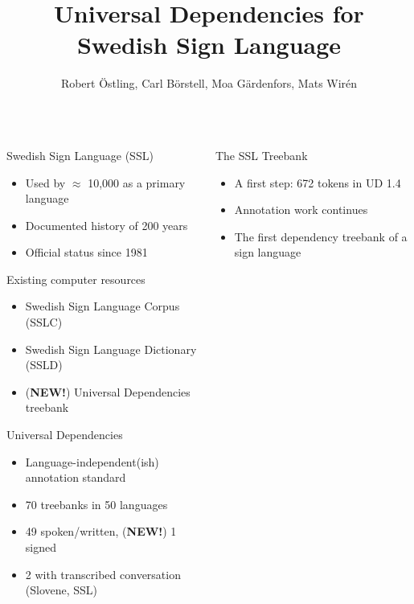 \documentclass[final]{beamer}
\title{Universal Dependencies for Swedish Sign Language}
\author{Robert {\"O}stling, Carl B{\"o}rstell, Moa G{\"a}rdenfors,
    Mats Wir{\'e}n}
\institute{Stockholm University}
\begin{document}
\begin{frame}{}
    \vfill
    \begin{columns}[t]
        \begin{column}{.48\linewidth}

            \begin{block}{\large Swedish Sign Language (SSL)}
                \begin{itemize}
                    \item Used by $\approx$ 10,000 as a primary language
                    \item Documented history of 200 years
                    \item Official status since 1981
                \end{itemize}
            \end{block}

            \begin{block}{\large Existing computer resources}
                \begin{itemize}
                    \item Swedish Sign Language Corpus (SSLC)
                    \item Swedish Sign Language Dictionary (SSLD)
                    \item (\textbf{NEW!}) Universal Dependencies treebank
                \end{itemize}
            \end{block}

            \begin{block}{\large Universal Dependencies}
                \begin{itemize}
                    \item Language-independent(ish) annotation standard
                    \item 70 treebanks in 50 languages
                    \item 49 spoken/written, (\textbf{NEW!}) 1 signed
                    \item 2 with transcribed conversation (Slovene, SSL)
                \end{itemize}
            \end{block}


        \end{column}

        \begin{column}{.48\linewidth}

            \begin{block}{\large The SSL Treebank}
                \begin{itemize}
                    \item A first step: 672 tokens in UD 1.4
                    \item Annotation work continues
                    \item The first dependency treebank of a sign language
                \end{itemize}
            \end{block}


\end{column}
\end{columns}
\end{frame}
\end{document}
